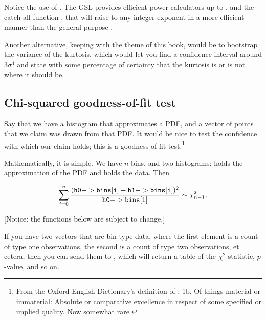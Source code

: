 Notice the use of . The GSL provides efficient
power calculators up to , and the catch-all function
, that will raise
 to any integer exponent in a more efficient manner than the
general-purpose .

Another alternative, keeping with the theme of this book, would be
to bootstrap the variance of the kurtosis, which would let you find a
confidence interval around $3 \sigma^4$ and state with some percentage
of certainty that the kurtosis is or is not where it should
be.\label{bootkurt}


\subsection{Chi-squared goodness-of-fit test} 
Say that we have a histogram that approximates a PDF, and a vector of
points that we claim was drawn from that PDF. It would be nice to test
the confidence with which our claim holds; this is a goodness
of fit test.\footnote{
From the Oxford English Dictionary's definition of :
    1b. Of things material or immaterial: Absolute or comparative
    excellence in respect of some specified or implied quality. Now
    somewhat rare.}

Mathematically, it is simple. We have $n$ bins, and two histograms:
holds the approximation of the PDF and  holds the data. Then 

\begin{equation}    \label{gofstat}
\sum_{i=0}^n {\frac{({\tt h0->bins[i]} - {\tt h1->bins[i]})^2}{{\tt h0->bins[i]}}} \sim \chi^2_{n-1}.
\end{equation}

[Notice: the functions below are subject to change.]

If you have two vectors that are bin-type data, where the first element
is a count of type one observations, the second is a count of type two
observations, et cetera, then you can send them to
, which will return a table
of the $\chi^2$ statistic, $p$-value, and so on.

